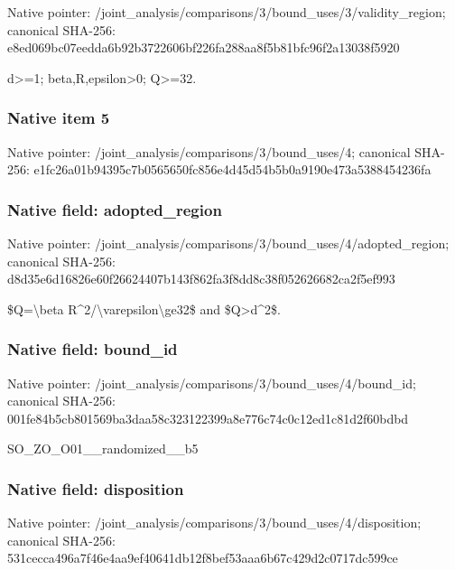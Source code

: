 \documentclass[10pt,a4paper]{article}
\begin{document}
Native pointer: /joint\_analysis/comparis\allowbreak{}ons/3/bound\_uses/3/valid\allowbreak{}ity\_region; canonical SHA-256: e8ed069bc07eedda6b92b372\allowbreak{}2606bf226fa288aa8f5b81bf\allowbreak{}c96f2a13038f5920


d>=1; beta,R,epsilon>0; Q>=32.


\subsubsection{Native item 5}


Native pointer: /joint\_analysis/comparis\allowbreak{}ons/3/bound\_uses/4; canonical SHA-256: e1fc26a01b94395c7b056565\allowbreak{}0fc856e4d45d54b5b0a9190e\allowbreak{}473a5388454236fa



\subsubsection{Native field: adopted\_region}


Native pointer: /joint\_analysis/comparis\allowbreak{}ons/3/bound\_uses/4/adopt\allowbreak{}ed\_region; canonical SHA-256: d8d35e6d16826e60f2662440\allowbreak{}7b143f862fa3f8dd8c38f052\allowbreak{}626682ca2f5ef993


\$Q=\textbackslash{}beta R\textasciicircum{}2/\textbackslash{}varepsilon\textbackslash{}ge32\$ and \$Q>d\textasciicircum{}2\$.


\subsubsection{Native field: bound\_id}


Native pointer: /joint\_analysis/comparis\allowbreak{}ons/3/bound\_uses/4/bound\allowbreak{}\_id; canonical SHA-256: 001fe84b5cb801569ba3daa5\allowbreak{}8c323122399a8e776c74c0c1\allowbreak{}2ed1c81d2f60bdbd


SO\_ZO\_O01\_\_randomized\_\_b5


\subsubsection{Native field: disposition}


Native pointer: /joint\_analysis/comparis\allowbreak{}ons/3/bound\_uses/4/dispo\allowbreak{}sition; canonical SHA-256: 531cecca496a7f46e4aa9ef4\allowbreak{}0641db12f8bef53aaa6b67c4\allowbreak{}29d2c0717dc599ce
\end{document}
